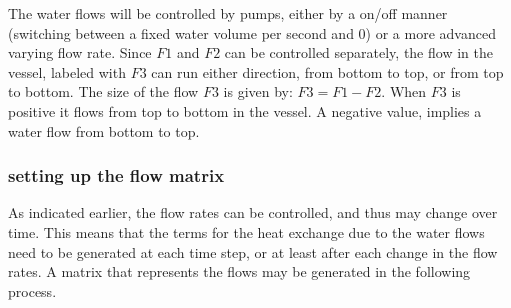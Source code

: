 The water flows will be controlled by pumps, either by a on/off manner (switching between a fixed water volume per second and 0) or a more advanced varying flow rate. 
Since $F1$ and $F2$ can be controlled separately, the flow in the vessel, labeled with $F3$ can run either direction, from bottom to top, or from top to bottom. The size of the flow $F3$ is given by: $F3 = F1 - F2$. When $F3$ is positive it flows from top to bottom in the vessel. A negative value, implies a water flow from bottom to top. 


\subsubsection{setting up the flow matrix}
As indicated earlier, the flow rates can be controlled, and thus may change over time. This means that the terms for the heat exchange due to the water flows need to be generated at each time step, or at least after each change in the flow rates. A matrix that represents the flows may be generated in the following process.

